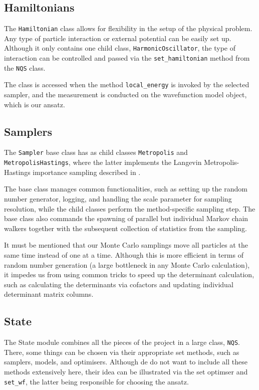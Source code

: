 \subsection{Hamiltonians}
The \verb|Hamiltonian| class allows for flexibility in the setup of the physical problem. Any type of particle interaction or external potential can be easily set up. Although it only contains one child class, \verb|HarmonicOscillator|, the type of interaction can be controlled and passed via the \verb|set_hamiltonian| method from the \verb|NQS| class. 

The class is accessed when the method \verb|local_energy| is invoked by the selected sampler, and the measurement is conducted on the wavefunction model object, which is our ansatz.

\subsection{Samplers}

The \verb|Sampler| base class has as child classes \verb|Metropolis| and \verb|MetropolisHastings|, where the latter implements the Langevin Metropolis-Hastings importance sampling described in . 

The base class manages common functionalities, such as setting up the random number generator, logging, and handling the scale parameter for sampling resolution, while the child classes perform the method-specific sampling step. The base class also commands the spawning of parallel but individual Markov chain walkers together with the subsequent collection of statistics from the sampling.

It must be mentioned that our Monte Carlo samplings move all particles at the same time instead of one at a time. Although this is more efficient in terms of random number generation (a large bottleneck in any Monte Carlo calculation), it impedes us from using common tricks to speed up the determinant calculation, such as calculating the determinants via cofactors and updating individual determinant matrix columns. 


\subsection{State}
The State module combines all the pieces of the project in a large class, \verb|NQS|. There, some things can be chosen via their appropriate set methods, such as samplers, models, and optimisers. Although de do not want to include all these methods extensively here, their idea can be illustrated via the set optimser and \verb|set_wf|, the latter being responsible for choosing the ansatz.

